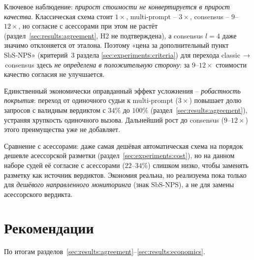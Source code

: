 Ключевое наблюдение: \emph{прирост стоимости не конвертируется в прирост
качества}. Классическая схема стоит $1\times$, multi-prompt -- $3\times$,
consensus -- $9$--$12\times$, но согласие с асессорами при этом не растёт
(раздел~\ref{sec:results:agreement}, H2 не подтверждена), а consensus
$l{=}4$ даже значимо отклоняется от эталона. Поэтому «цена за дополнительный
пункт $\mathrm{SbS\text{-}NPS}$» (критерий~3 раздела
\ref{sec:experiments:criteria}) для перехода classic\,$\to$\,consensus
здесь \emph{не определена в положительную сторону}: за $9$--$12\times$
стоимости качество согласия не улучшается.

Единственный экономически оправданный эффект усложнения -- \emph{робастность
покрытия}: переход от одиночного судьи к multi-prompt ($3\times$) повышает
долю запросов с валидным вердиктом с $34\%$ до $100\%$
(раздел~\ref{sec:results:agreement}), устраняя хрупкость одиночного
вызова. Дальнейший рост до consensus ($9$--$12\times$) этого преимущества
уже не добавляет.

Сравнение с асессорами: даже самая дешёвая автоматическая схема на порядок
дешевле асессорской разметки (раздел~\ref{sec:experiments:cost}), но на
данном наборе судей её согласие с асессорами ($22$--$34\%$) слишком низко,
чтобы заменять разметку как источник вердиктов. Экономия реальна, но
реализуема пока только для \emph{дешёвого направленного мониторинга}
(знак $\mathrm{SbS\text{-}NPS}$), а не для замены асессорского вердикта.

\section{Рекомендации}
\label{sec:results:recommendations}

По итогам разделов~\ref{sec:results:agreement}--\ref{sec:results:economics}.

